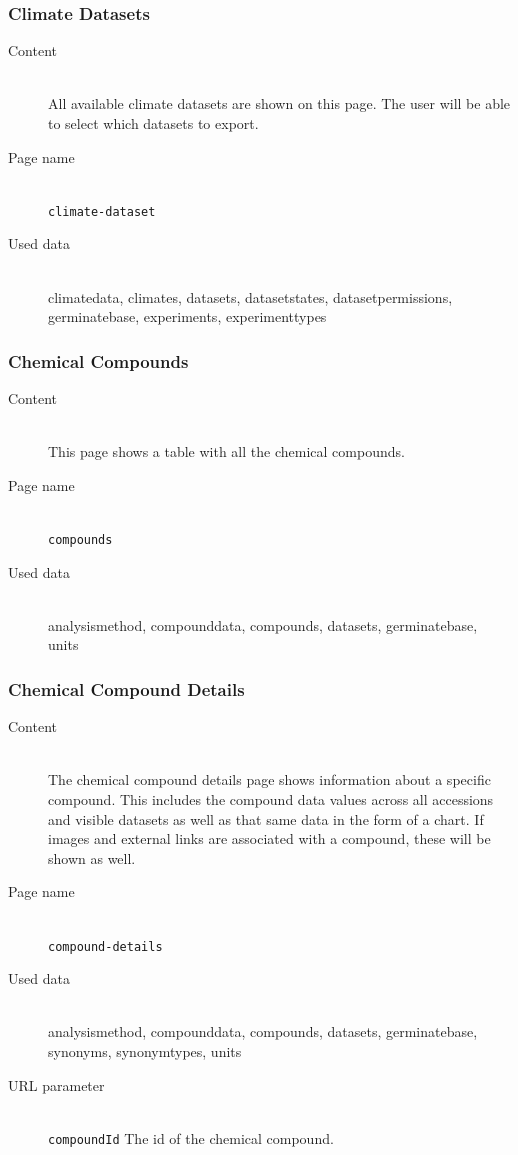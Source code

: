 \subsubsection{Climate Datasets}
\begin{description}
	\item[Content]\hfill\\All available climate datasets are shown on this page. The user will be able to select which datasets to export.
	\item[Page name]\hfill\\\texttt{climate-dataset}
	\item[Used data]\hfill\\climatedata, climates, datasets, datasetstates, datasetpermissions, germinatebase, experiments, experimenttypes
\end{description}

\subsubsection{Chemical Compounds}
\begin{description}
	\item[Content]\hfill\\This page shows a table with all the chemical compounds.
	\item[Page name]\hfill\\\texttt{compounds}
	\item[Used data]\hfill\\analysismethod, compounddata, compounds, datasets, germinatebase, units
\end{description}

\subsubsection{Chemical Compound Details}
\begin{description}
	\item[Content]\hfill\\The chemical compound details page shows information about a specific compound. This includes the compound data values across all accessions and visible datasets as well as that same data in the form of a chart. If images and external links are associated with a compound, these will be shown as well.
	\item[Page name]\hfill\\\texttt{compound-details}
	\item[Used data]\hfill\\analysismethod, compounddata, compounds, datasets, germinatebase, synonyms, synonymtypes, units
	\item[URL parameter]\hfill\\\texttt{compoundId} The id of the chemical compound.
\end{description}

